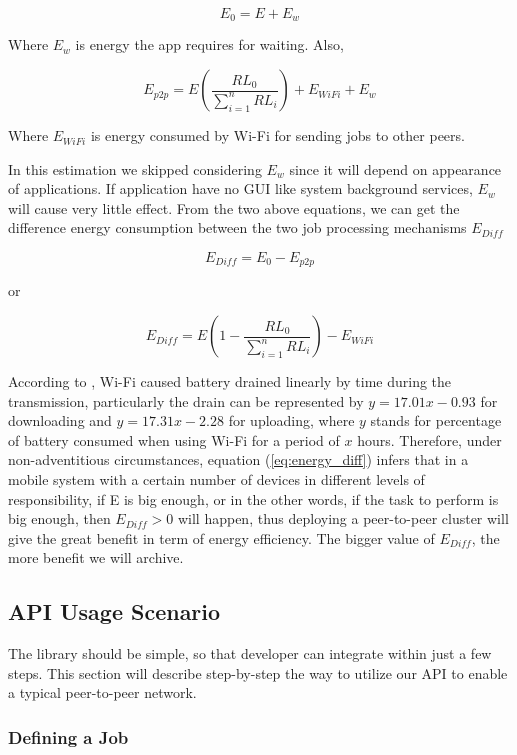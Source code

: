 \documentclass[conference]{IEEEtran}
\begin{document}
$$E_{0} = E + E_{w}$$

Where $E_{w}$ is energy the app requires for waiting. Also, 

$$E_{p2p} = E(\frac{RL_{0}}{\sum_{i = 1}^{n}{RL_{i}}}) + E_{WiFi} + E_{w}$$ 

Where $E_{WiFi}$ is energy consumed by Wi-Fi for sending jobs to other peers.

In this estimation we skipped considering $E_{w}$ since it will depend on appearance of applications. If application have no GUI like system background services, $E_{w}$ will cause very little effect. From the two above equations, we can get the difference energy consumption between the two job processing mechanisms $E_{Diff}$ 

$$E_{Diff} = E_{0} - E_{p2p}$$ 

or 

\begin{equation}
\label{eq:energy_diff}
E_{Diff} = E(1 - \frac{RL_{0}}{\sum_{i=1}^{n}{RL_{i}}}) - E_{WiFi}
\end{equation}

According to \cite{wifi_energy}, Wi-Fi caused battery drained linearly by time during the transmission, particularly the drain can be represented by $y = 17.01x - 0.93$ for downloading and $y = 17.31x - 2.28$ for uploading, where $y$ stands for percentage of battery consumed when using Wi-Fi for a period of $x$ hours. Therefore, under non-adventitious circumstances, equation (\ref{eq:energy_diff}) infers that in a mobile system with a certain number of devices in different levels of responsibility, if E is big enough, or in the other words, if the task to perform is big enough, then $E_{Diff} > 0$ will happen, thus deploying a peer-to-peer cluster will give the great benefit in term of energy efficiency. The bigger value of $E_{Diff}$, the more benefit we will archive.

\subsection{API Usage Scenario}

The library should be simple, so that developer can integrate within just a few steps. This section will describe step-by-step the way to utilize our API to enable a typical peer-to-peer network.

\subsubsection{Defining a Job}
\end{document}

